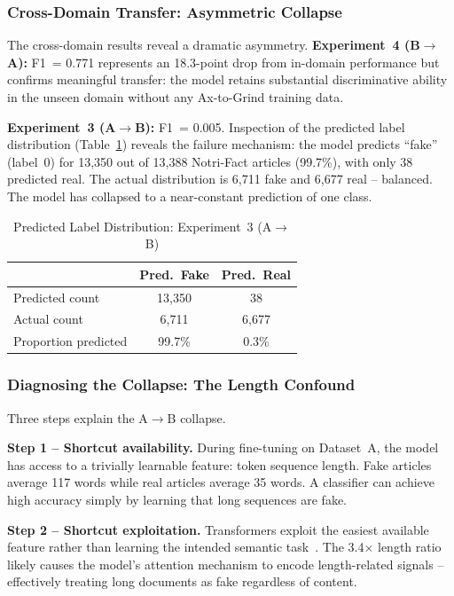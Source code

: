 \documentclass[conference]{IEEEtran}
\begin{document}
\subsubsection{Cross-Domain Transfer: Asymmetric Collapse}

The cross-domain results reveal a dramatic asymmetry.
\textbf{Experiment~4 (B$\rightarrow$A):} F1~= 0.771 represents an
18.3-point drop from in-domain performance but confirms meaningful
transfer: the model retains substantial discriminative ability in the
unseen domain without any Ax-to-Grind training data.

\textbf{Experiment~3 (A$\rightarrow$B):} F1~= 0.005. Inspection of
the predicted label distribution (Table~\ref{tab:prediction_collapse})
reveals the failure mechanism: the model predicts ``fake'' (label~0)
for 13,350 out of 13,388 Notri-Fact articles (99.7\%), with only 38
predicted real. The actual distribution is 6,711 fake and 6,677 real
-- balanced. The model has collapsed to a near-constant prediction of
one class.

\begin{table}[h!]
\centering
\caption{Predicted Label Distribution: Experiment~3 (A$\to$B)}
\label{tab:prediction_collapse}
\begin{tabular}{lcc}
\toprule
 & \textbf{Pred.\ Fake} & \textbf{Pred.\ Real} \\
\midrule
Predicted count      & 13,350 & 38 \\
Actual count         & 6,711  & 6,677 \\
Proportion predicted & 99.7\% & 0.3\% \\
\bottomrule
\end{tabular}
\end{table}

\subsubsection{Diagnosing the Collapse: The Length Confound}

Three steps explain the A$\to$B collapse.

\textbf{Step 1 -- Shortcut availability.} During fine-tuning on
Dataset~A, the model has access to a trivially learnable
feature: token sequence length. Fake articles average 117 words
while real articles average 35 words. A classifier can achieve high
accuracy simply by learning that long sequences are fake.

\textbf{Step 2 -- Shortcut exploitation.} Transformers exploit the
easiest available feature rather than learning the intended semantic
task~\cite{geirhos2020shortcut, wang2021spurious}. The 3.4$\times$
length ratio likely causes the model's attention mechanism to encode
length-related signals -- effectively treating long documents as fake
regardless of content.
\end{document}
